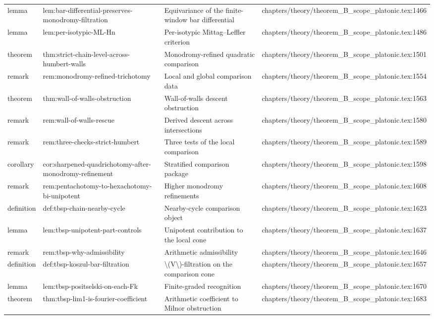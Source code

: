 \documentclass[11pt]{article}
\begin{document}
\begin{longtable}{L{0.10\textwidth}L{0.26\textwidth}L{0.42\textwidth}L{0.22\textwidth}}
lemma & lem:bar-differential-preserves-monodromy-filtration & Equivariance of the finite-window bar differential & chapters/theory/theorem\_B\_scope\_platonic.tex:1466\\
lemma & lem:per-isotypic-ML-Hn & Per-isotypic Mittag--Leffler criterion & chapters/theory/theorem\_B\_scope\_platonic.tex:1486\\
theorem & thm:strict-chain-level-across-humbert-walls & Monodromy-refined quadratic comparison & chapters/theory/theorem\_B\_scope\_platonic.tex:1501\\
remark & rem:monodromy-refined-trichotomy & Local and global comparison data & chapters/theory/theorem\_B\_scope\_platonic.tex:1554\\
theorem & thm:wall-of-walls-obstruction & Wall-of-walls descent obstruction & chapters/theory/theorem\_B\_scope\_platonic.tex:1563\\
remark & rem:wall-of-walls-rescue & Derived descent across intersections & chapters/theory/theorem\_B\_scope\_platonic.tex:1580\\
remark & rem:three-checks-strict-humbert & Three tests of the local comparison & chapters/theory/theorem\_B\_scope\_platonic.tex:1589\\
corollary & cor:sharpened-quadrichotomy-after-monodromy-refinement & Stratified comparison package & chapters/theory/theorem\_B\_scope\_platonic.tex:1598\\
remark & rem:pentachotomy-to-hexachotomy-bi-unipotent & Higher monodromy refinements & chapters/theory/theorem\_B\_scope\_platonic.tex:1608\\
definition & def:tbsp-chain-nearby-cycle & Nearby-cycle comparison object & chapters/theory/theorem\_B\_scope\_platonic.tex:1623\\
lemma & lem:tbsp-unipotent-part-controls & Unipotent contribution to the local cone & chapters/theory/theorem\_B\_scope\_platonic.tex:1637\\
remark & rem:tbsp-why-admissibility & Arithmetic admissibility & chapters/theory/theorem\_B\_scope\_platonic.tex:1646\\
definition & def:tbsp-koszul-bar-filtration & \textbackslash{}(V\textbackslash{})-filtration on the comparison cone & chapters/theory/theorem\_B\_scope\_platonic.tex:1657\\
lemma & lem:tbsp-positselski-on-each-Fk & Finite-graded recognition & chapters/theory/theorem\_B\_scope\_platonic.tex:1670\\
theorem & thm:tbsp-lim1-is-fourier-coefficient & Arithmetic coefficient to Milnor obstruction & chapters/theory/theorem\_B\_scope\_platonic.tex:1683\\

\end{longtable}
\end{document}
